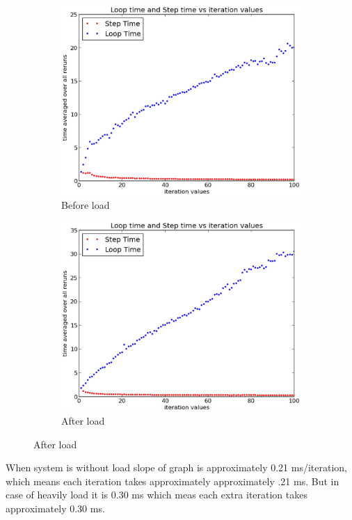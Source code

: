 \documentclass[a4paper,11pt]{article}
\begin{document}
{{\begin{figure}[h]
\centering
\begin{subfigure}{.5\textwidth}
  \centering
  \includegraphics[width=1.0\linewidth]{plot1}
  \caption{Before load}
\end{subfigure}%
\begin{subfigure}{.5\textwidth}
  \centering
  \includegraphics[width=1.0\linewidth]{plot2}
  \caption{After load}
\end{subfigure}
\end{figure}

\indent When system is without load slope of graph is approximately 0.21 ms/iteration, which means each iteration takes approximately approximately .21 ms. But in case of heavily load it is 0.30 ms which meas each extra iteration takes approximately 0.30 ms.

}}
\end{document}
